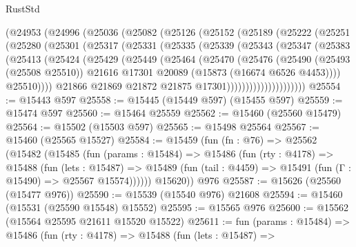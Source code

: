 \begin{lexlean}{RustStd}
\begin{coremodule}
      (@24953
        (@24996
          (@25036
            (@25082
              (@25126
                (@25152
                  (@25189
                    (@25222
                      (@25251
                        (@25280
                          (@25301
                            (@25317
                              (@25331
                                (@25335
                                  (@25339
                                    (@25343
                                      (@25347
                                        (@25383
                                          (@25413
                                            (@25424
                                              (@25429
                                                (@25449
                                                  (@25464
                                                    (@25470
                                                      (@25476
                                                        (@25490
                                                          (@25493 (@25508 @25510))
                                                          @21616
                                                          @17301
                                                          @20089
                                                          (@15873 (@16674 @6526 @4453))))
                                                      @25510))))
                                              @21866
                                              @21869
                                              @21872
                                              @21875
                                              @17301)))))))))))))))))))))
@25554 := @15443 @597
@25558 := @15445 (@15449 @597) (@15455 @597)
@25559 := @15474 @597
@25560 := @15464 @25559
@25562 := @15460 (@25560 @15479)
@25564 := @15502 (@15503 @597)
@25565 := @15498 @25564
@25567 := @15460 (@25565 @15527)
@25584 := @15459
    (fun (fn : @76) =>
    @25562
      (@15482
        (@15485
          (fun (params : @15484) =>
          @15486
            (fun (rty : @4178) =>
            @15488
              (fun (lets : @15487) =>
              @15489 (fun (tail : @4459) => @15491 (fun (Γ : @15490) => @25567 @15574))))))
        @15620))
    @976
@25587 := @15626 (@25560 (@15477 @976))
@25590 := @15539 (@15540 @976) @21608
@25594 := @15460 (@15531 (@25590 @15548) @15552)
@25595 := @15565 @976
@25600 := @15562 (@15564 @25595 @21611 @15520 @15522)
@25611 := fun (params : @15484) =>
  @15486
    (fun (rty : @4178) =>
    @15488
      (fun (lets : @15487) =>

\end{coremodule}
\end{lexlean}
